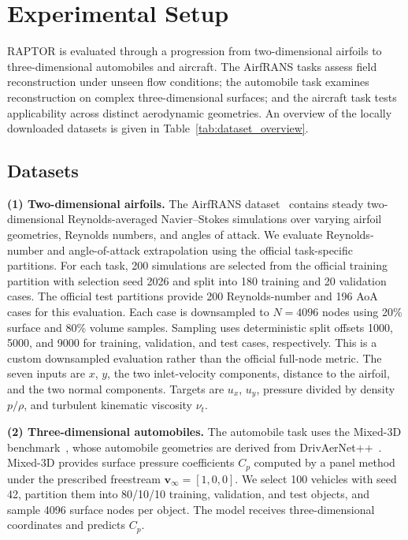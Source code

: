 \documentclass[a4paper,fleqn]{cas-sc}
\begin{document}
\section{Experimental Setup}
\label{sec:experimental_setup}

RAPTOR is evaluated through a progression from two-dimensional airfoils
to three-dimensional automobiles and aircraft. The AirfRANS tasks assess
field reconstruction under unseen flow conditions; the automobile task
examines reconstruction on complex three-dimensional surfaces; and the aircraft task tests
applicability across distinct aerodynamic geometries. An overview of
the locally downloaded datasets is given in
Table~\ref{tab:dataset_overview}.

\subsection{Datasets}
\label{subsec:datasets}

\textbf{(1) Two-dimensional airfoils.}
The AirfRANS dataset~\citep{ref04} contains steady two-dimensional
Reynolds-averaged Navier--Stokes simulations over varying airfoil
geometries, Reynolds numbers, and angles of attack. We evaluate
Reynolds-number and angle-of-attack extrapolation using the official
task-specific partitions. For each task, 200 simulations are selected
from the official training partition with selection seed 2026 and split
into 180 training and 20 validation cases. The official test partitions
provide 200 Reynolds-number and 196 AoA cases for this evaluation. Each case is downsampled to
\(N=4096\) nodes using 20\% surface and 80\% volume samples. Sampling
uses deterministic split offsets 1000, 5000, and 9000 for training,
validation, and test cases, respectively. This is a custom downsampled
evaluation rather than the official full-node metric. The seven inputs
are \(x\), \(y\), the two inlet-velocity components, distance to the
airfoil, and the two normal components. Targets are \(u_x\), \(u_y\),
pressure divided by density \(p/\rho\), and turbulent kinematic
viscosity \(\nu_t\).

\textbf{(2) Three-dimensional automobiles.}
The automobile task uses the Mixed-3D benchmark~\citep{ref18,ref37}, whose
automobile geometries are derived from DrivAerNet++~\citep{ref05}. Mixed-3D
provides surface pressure coefficients \(C_p\) computed by a panel method
under the prescribed freestream \(\mathbf v_\infty=[1,0,0]\). We select
100 vehicles with seed 42, partition them into 80/10/10 training,
validation, and test objects, and sample 4096 surface nodes per object.
The model receives three-dimensional coordinates and predicts \(C_p\).
\end{document}
